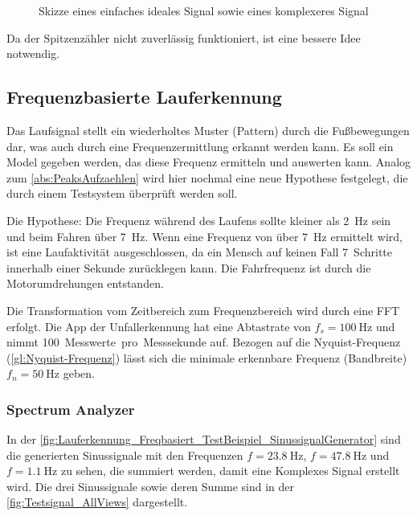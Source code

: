 \begin{figure}
	\centering
	\hfill
	\caption{Skizze eines einfaches ideales Signal sowie eines komplexeres Signal}
	\label{fig:Skizze_IdealUndEchtSignal}
\end{figure}

Da der Spitzenzähler nicht zuverlässig funktioniert, ist eine bessere Idee notwendig. 


\subsection{Frequenzbasierte Lauferkennung}

Das Laufsignal stellt ein wiederholtes Muster (Pattern) durch die Fußbewegungen dar, was auch durch eine Frequenzermittlung erkannt werden kann.
Es soll ein Model gegeben werden, das diese Frequenz ermitteln und auswerten kann.
Analog zum \autoref{abs:PeaksAufzaehlen} wird hier nochmal eine neue Hypothese festgelegt, die durch einem Testsystem überprüft werden soll.

Die Hypothese: Die Frequenz während des Laufens sollte kleiner als \SI{2}{\hertz} sein und beim Fahren über \SI{7}{\hertz}. Wenn eine Frequenz von über \SI{7}{\hertz} ermittelt wird, ist eine Laufaktivität ausgeschlossen, da ein Mensch auf keinen Fall \SI{7}{Schritte} innerhalb einer Sekunde zurücklegen kann. Die Fahrfrequenz ist durch die Motorumdrehungen entstanden. 

Die Transformation vom Zeitbereich zum Frequenzbereich wird durch eine FFT erfolgt.
Die App der Unfallerkennung hat eine Abtastrate von $f_s = \SI{100}{\hertz}$ und nimmt \SI{100}{Messwerte pro Messsekunde} auf.
Bezogen auf die Nyquist-Frequenz (\autoref{gl:Nyquist-Frequenz}) lässt sich die minimale erkennbare Frequenz (Bandbreite) $f_n = \SI{50}{\hertz}$ geben.

\subsubsection{Spectrum Analyzer}
In der \autoref{fig:Lauferkennung_Freqbasiert_TestBeispiel_SinussignalGenerator} sind die generierten Sinussignale mit den Frequenzen $f=\SI{23,8}{\hertz}$, $f=\SI{47,8}{\hertz}$ und $f=\SI{1,1}{\hertz}$ zu sehen, die summiert werden, damit eine Komplexes Signal erstellt wird. Die drei Sinussignale sowie deren Summe sind in der \autoref{fig:Testsignal_AllViews} dargestellt.

